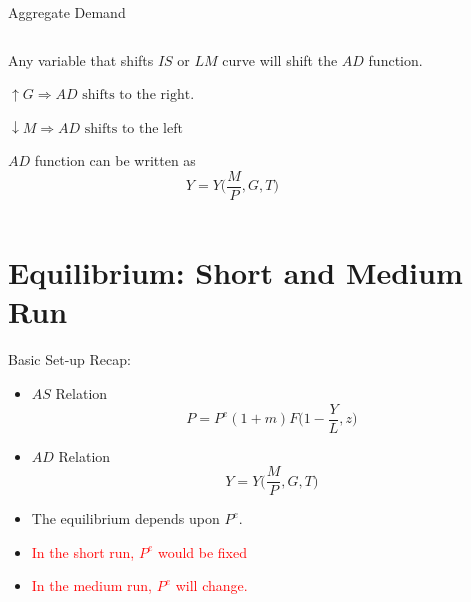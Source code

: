 \documentclass[shownotes,11pt, aspectratio=169]{beamer}
\newenvironment{wideitemize}{\itemize\addtolength{\itemsep}{10pt}}{\enditemize}
\begin{document}
\begin{frame}{Aggregate Demand}
\begin{columns}[T] %
\begin{column}{.44\textwidth}
  \begin{wideitemize}
    \item Any variable that shifts $IS$ or $LM$ curve will shift the $AD$ function.
    \item $\uparrow G \Rightarrow AD \text{ shifts to the right}$.
    \item $\downarrow M \Rightarrow AD \text{ shifts to the left}$
    \item $AD$ function can be written as 
        \[ Y = Y\Bigg(\frac{M}{P}, G, T\Bigg) \]
  \end{wideitemize}
\end{column}%
\pause
\hfill%
\begin{column}{.53\textwidth}
\end{column}%
\end{columns}
\end{frame}

\section{Equilibrium: Short and Medium Run}
\begin{frame}{Basic Set-up}
Recap:

\begin{itemize}
\item $AS$ Relation
      \[ P = P^e(1 + m)F\Bigg(1 - \frac{Y}{L}, z\Bigg) \]
\item $AD$ Relation
      \[ Y = Y\Bigg(\frac{M}{P}, G, T\Bigg) \]
\item The equilibrium depends upon $P^e$.
\item \textcolor{red}{In the short run, $P^e$ would be fixed}
\item \textcolor{red}{In the medium run, $P^e$ will change.}
\end{itemize}
\end{frame}
\end{document}
